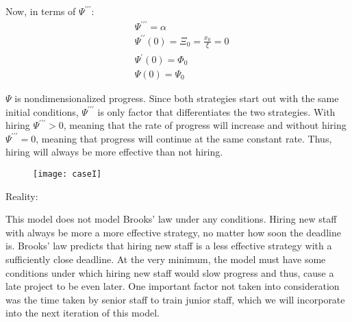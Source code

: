 \documentclass{article}
\newenvironment{atomize}
    {\begin{list} {} {
            \setlength\itemindent{0pt}
            \setlength\leftmargin{10pt}
            \setlength\labelwidth{0pt}
    }}
    {\end{list}}
\begin{document}
\begin{atomize}
\begin{atomize}
        \item Now, in terms of $\Psi^{\prime\prime\prime}$:
          \begin{align*}
            &\Psi^{\prime\prime\prime} = \alpha \\[6pt]
            &\Psi^{\prime\prime}(0) = \Xi_{0} = \frac{x_{0}}{\xi} = 0 \\[6pt]
            &\Psi^{\prime}(0) = \Phi_{0} \\[6pt]
            &\Psi(0) = \Psi_{0}
          \end{align*}

        \item $\Psi$ is nondimensionalized progress. Since both strategies start
        out with the same initial conditions, $\Psi^{\prime\prime\prime}$ 
        is only factor that differentiates the two strategies.  With hiring
        $\Psi^{\prime\prime\prime} > 0$, meaning that the rate of progress will
        increase and without hiring $\Psi^{\prime\prime\prime} = 0$, meaning
        that progress will continue at the same constant rate. Thus, hiring
        will always be more effective than not hiring. 
        \item 
          \begin{figure}[H]
            \centering
            \texttt{[image: caseI]}
          \end{figure}
      \end{atomize}

    \item Reality:
      \begin{atomize}
        \item This model does not model Brooks' law under any conditions.
        Hiring new staff with always be more a more effective strategy, no
        matter how soon the deadline is. Brooks' law predicts that hiring
        new staff is a less effective strategy with a sufficiently close
        deadline.  At the very minimum, the model must have some conditions
        under which hiring new staff would slow progress and thus, cause a
        late project to be even later. One important factor not taken into
        consideration was the time taken by senior staff to train junior
        staff, which we will incorporate into the next iteration of this
        model.
      \end{atomize}
  \end{atomize}

\pagebreak
\end{document}
